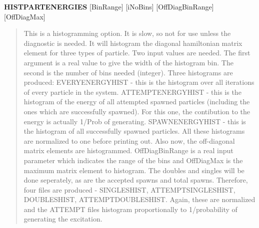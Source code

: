 \documentclass[openany,a4paper,10pt]{manual}
\begin{document}
\textbf{HISTPARTENERGIES} {[}BinRange{]} {[}iNoBins{]} {[}OffDiagBinRange{]} {[}OffDiagMax{]}
\begin{quote}

This is a histogramming option. It is slow, so not for use unless the diagnostic is needed. It will histogram
the diagonal hamiltonian matrix element for three types of particle. Two input values are needed. The first
argument is a real value to give the width of the histogram bin. The second is the number of bins needed (integer).
Three histograms are produced: EVERYENERGYHIST - this is the histogram over all iterations of every particle in the
system. ATTEMPTENERGYHIST - this is the histogram of the energy of all attempted spawned particles (including the
ones which are successfully spawned). For this one, the contibution to the energy is actually 1/Prob of generating.
SPAWNENERGYHIST - this is the histogram of all successfully spawned particles. All these histograms are normalized to
one before printing out.
Also now, the off-diagonal matrix elements are histogrammed. OffDiagBinRange is a real input parameter which indicates
the range of the bins and OffDiagMax is the maximum matrix element to histogram. The doubles and singles will be done
seperately, as are the accepted spawns and total spawns. Therefore, four files are produced - SINGLESHIST, ATTEMPTSINGLESHIST,
DOUBLESHIST, ATTEMPTDOUBLESHIST. Again, these are normalized and the ATTEMPT files histogram proportionally to 1/probability
of generating the excitation.
\end{quote}
\end{document}
